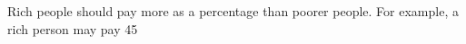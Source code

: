 Rich people should pay more as a percentage than poorer people. For example, a rich person may pay 45%

